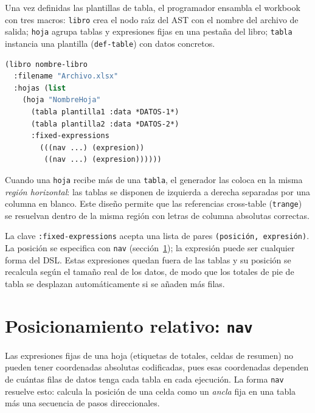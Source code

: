 \documentclass[12pt,a4paper]{report}
\begin{document}
Una vez definidas las plantillas de tabla, el programador ensambla el
workbook con tres macros: \texttt{libro} crea el nodo ra\'{\i}z del AST con
el nombre del archivo de salida; \texttt{hoja} agrupa tablas y expresiones
fijas en una pesta\~na del libro; \texttt{tabla} instancia una plantilla
(\texttt{def-table}) con datos concretos.

\begin{lstlisting}[language=CommonLisp,
  caption={Ensamblaje del workbook con libro, hoja y tabla.}]
(libro nombre-libro
  :filename "Archivo.xlsx"
  :hojas (list
    (hoja "NombreHoja"
      (tabla plantilla1 :data *DATOS-1*)
      (tabla plantilla2 :data *DATOS-2*)
      :fixed-expressions
        (((nav ...) (expresion))
         ((nav ...) (expresion))))))
\end{lstlisting}

Cuando una \texttt{hoja} recibe m\'as de una \texttt{tabla}, el generador
las coloca en la misma \emph{regi\'on horizontal}: las tablas se disponen de
izquierda a derecha separadas por una columna en blanco.  Este dise\~no
permite que las referencias cross-table (\texttt{trange}) se resuelvan
dentro de la misma regi\'on con letras de columna absolutas correctas.

La clave \texttt{:fixed-expressions} acepta una lista de pares
\texttt{(posici\'on, expresi\'on)}.  La posici\'on se especifica con
\texttt{nav} (secci\'on~\ref{sec:nav}); la expresi\'on puede ser cualquier
forma del DSL.  Estas expresiones quedan fuera de las tablas y su posici\'on
se recalcula seg\'un el tama\~no real de los datos, de modo que los totales
de pie de tabla se desplazan autom\'aticamente si se a\~naden m\'as filas.

\section{Posicionamiento relativo: \texttt{nav}}
\label{sec:nav}

Las expresiones fijas de una hoja (etiquetas de totales, celdas de resumen)
no pueden tener coordenadas absolutas codificadas, pues esas coordenadas
dependen de cu\'antas filas de datos tenga cada tabla en cada ejecuci\'on.
La forma \texttt{nav} resuelve esto: calcula la posici\'on de una celda como
un \emph{ancla} fija en una tabla m\'as una secuencia de pasos
direccionales.
\end{document}
